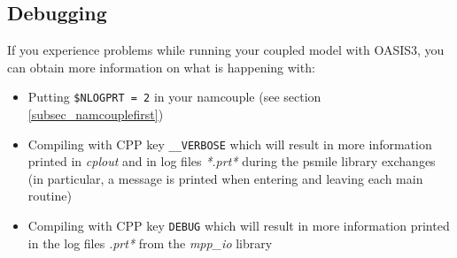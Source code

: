 \subsection{Debugging}

If you experience problems while running your coupled model with OASIS3, you can obtain more information on what is happening with:
\begin{itemize}
\item Putting {\tt \$NLOGPRT = 2} in your namcouple (see section \ref{subsec_namcouplefirst})
\item Compiling with CPP key {\tt \_\_VERBOSE} which will result in
  more information printed in {\it cplout} and in log files {\it
    *.prt*} during the psmile library exchanges (in particular, a
  message is printed when entering and leaving each main routine)
\item Compiling with CPP key {\tt DEBUG} which will result in
  more information printed in the log files {\it *.prt*}  from the
  {\it mpp\_io} library
\end{itemize}


